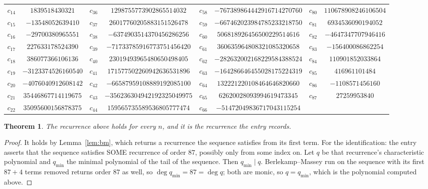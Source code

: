 \documentclass[11pt,a4paper]{article}
\theoremstyle{plain}
\newtheorem{theorem}{Theorem}
\theoremstyle{definition}
\begin{document}
\begin{center}
\begin{tabular}{cccccccc}
$c_{14}$ & $1839518430321$ & $c_{36}$ & $1298755773902865514032$ & $c_{58}$ & $-767389864442916714270760$ & $c_{80}$ & $110678908246106504$ \\
$c_{15}$ & $-13548052639410$ & $c_{37}$ & $26017760205883151526478$ & $c_{59}$ & $-667462023984785233218750$ & $c_{81}$ & $6934536090194052$ \\
$c_{16}$ & $-29700380965551$ & $c_{38}$ & $-6374903514370456286256$ & $c_{60}$ & $506818926456500229514616$ & $c_{82}$ & $-4647347707946416$ \\
$c_{17}$ & $227633178524390$ & $c_{39}$ & $-71733785916773751456420$ & $c_{61}$ & $360635964808321085320658$ & $c_{83}$ & $-156400086862254$ \\
$c_{18}$ & $386077366106136$ & $c_{40}$ & $23019493965480650498405$ & $c_{62}$ & $-282632002168229584388524$ & $c_{84}$ & $110901852033864$ \\
$c_{19}$ & $-3123374526160540$ & $c_{41}$ & $171577502260942636531896$ & $c_{63}$ & $-164286646455028175224319$ & $c_{85}$ & $416961101484$ \\
$c_{20}$ & $-4076040912608142$ & $c_{42}$ & $-66587959108889192085100$ & $c_{64}$ & $132221220108464646820660$ & $c_{86}$ & $-1108571456160$ \\
$c_{21}$ & $35446867714119675$ & $c_{43}$ & $-356236304942192325049975$ & $c_{65}$ & $62620028093994619473345$ & $c_{87}$ & $27259953840$ \\
$c_{22}$ & $35095600156878375$ & $c_{44}$ & $159565735589536805777474$ & $c_{66}$ & $-51472049836717043115254$ &  &  \\
\end{tabular}
\end{center}

\begin{theorem}
The recurrence above holds for every $n$, and it is the recurrence the entry records.
\end{theorem}

\begin{proof}
It holds by Lemma~\ref{lem:bm}, which returns a recurrence the sequence satisfies from its
first term. For the identification: the entry asserts that the sequence satisfies SOME
recurrence of order $87$, possibly only from some index on. Let $q$ be that recurrence's
characteristic polynomial and $q_{\min}$ the minimal polynomial of the tail of the sequence.
Then $q_{\min}\mid q$. Berlekamp--Massey run on the sequence with its first $87+4$ terms
removed returns order $87$ as well, so $\deg q_{\min}=87=\deg q$; both are monic, so
$q=q_{\min}$, which is the polynomial computed above.
\end{proof}
\end{document}
